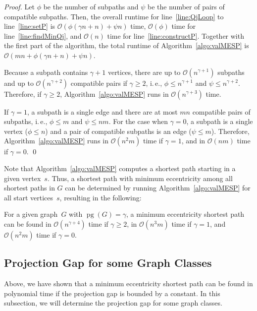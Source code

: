 \documentclass[10pt]{llncs}
\makeatletter
\newcommand{\calO}{\mathcal{O}}
\newcommand{\ie}{i.\,e.\@ifnextchar{,}{}{~}}
\DeclareMathOperator{\pg}{pg}
\makeatother
\begin{document}
\begin{proof}
Let $\phi$ be the number of subpaths and $\psi$ be the number of pairs of compatible subpaths.
Then, the overall runtime for line~\ref{line:QjLoop} to line~\ref{line:setP} is $\calO(\phi (\gamma n + n) + \psi n)$ time, $\calO(\phi)$ time for line~\ref{line:findMinQj}, and $\calO(n)$ time for line~\ref{line:constructP}.
Together with the first part of the algorithm, the total runtime of Algorithm~\ref{algo:valMESP} is $\calO(mn + \phi (\gamma n + n) + \psi n)$.

Because a subpath contains $\gamma + 1$ vertices, there are up to $\calO(n^{\gamma + 1})$ subpaths and up to $\calO(n^{\gamma + 2})$ compatible pairs if $\gamma \geq 2$, \ie, $\phi \leq n^{\gamma + 1}$ and $\psi \leq n^{\gamma + 2}$.
Therefore, if $\gamma \geq 2$, Algorithm~\ref{algo:valMESP} runs in $\calO(n^{\gamma+3})$ time.

If $\gamma = 1$, a subpath is a single edge and there are at most $mn$ compatible pairs of subpaths, \ie, $\phi \leq m$ and $\psi \leq nm$.
For the case when $\gamma = 0$, a subpath is a single vertex ($\phi \leq n$) and a pair of compatible subpaths is an edge ($\psi \leq m$).
Therefore, Algorithm~\ref{algo:valMESP} runs in $\calO(n^2m)$ time if $\gamma = 1$, and in $\calO(nm)$ time if $\gamma = 0$.
\qed
\end{proof}

Note that Algorithm~\ref{algo:valMESP} computes a shortest path starting in a given vertex~$s$.
Thus, a shortest path with minimum eccentricity among all shortest paths in $G$ can be determined by running Algorithm~\ref{algo:valMESP} for all start vertices~$s$, resulting in the following:

\begin{theorem}
For a given graph~$G$ with $\pg(G) = \gamma$, a  minimum eccentricity shortest path can be found in $\calO(n^{\gamma + 4})$ time if $\gamma \geq 2$, in $\calO(n^3m)$ time if $\gamma = 1$, and $\calO(n^2m)$ time if $\gamma = 0$.
\end{theorem}

\subsection{Projection Gap for some Graph Classes}

Above, we have shown that a minimum eccentricity shortest path can be found in polynomial time if the projection gap is bounded by a constant.
In this subsection, we will determine the projection gap for some graph classes.
\end{document}
